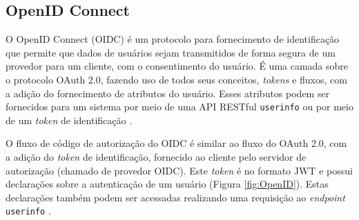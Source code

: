 \subsection{OpenID Connect}

O OpenID Connect (OIDC) é um protocolo para fornecimento de identificação que permite que dados de 
usuários sejam transmitidos de forma segura de um provedor para um cliente, com o consentimento do
usuário. É uma camada sobre o protocolo OAuth 2.0, fazendo uso de todos seus conceitos, 
\emph{tokens} e fluxos, com a adição do fornecimento de atributos do usuário. Esses atributos 
podem ser fornecidos para um sistema por meio de uma API RESTful \texttt{userinfo} ou por meio de 
um \emph{token} de identificação \cite{BIEHL2019}.

O fluxo de código de autorização do OIDC é similar ao fluxo do OAuth 2.0, com a adição do 
\emph{token} de identificação, fornecido ao cliente pelo servidor de autorização (chamado de 
provedor OIDC). Este \emph{token} é no formato JWT e possui declarações sobre a autenticação
de um usuário (Figura \ref{fig:OpenID}). Estas declarações também podem ser acessadas realizando uma 
requisição ao \emph{endpoint} \texttt{userinfo} \cite{OIDCCORE}. 



